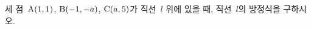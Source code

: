 세 점~$\mathrm{A}(1{,}\mkern3mu\mathopen{}1)$, $\mathrm{B}(-1{,}\mkern3mu\mathopen{}-a)$, $\mathrm{C}(a{,}\mkern3mu\mathopen{}5)$가 직선~$l$ 위에 있을 때, 직선~$l$의 방정식을 구하시오. 
